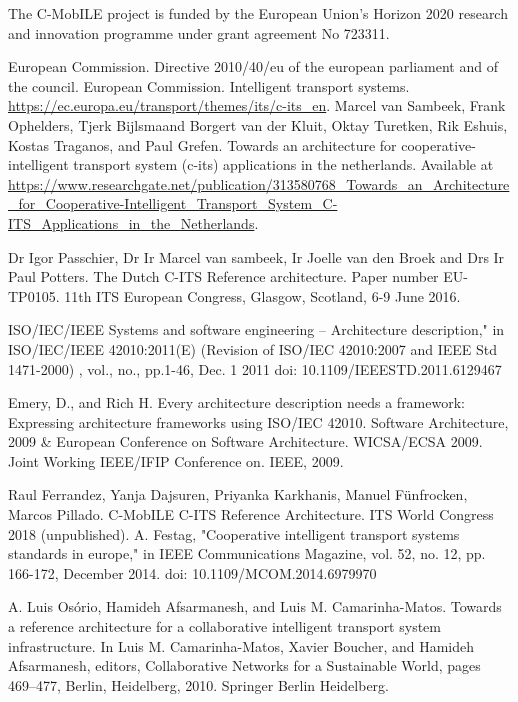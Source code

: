\documentclass[conference]{IEEEtran}
\begin{document}
The C-MobILE project is funded by the European Union's Horizon 2020 research and innovation programme under grant agreement No 723311.


\begin{thebibliography}{00}

     European Commission. Directive 2010/40/eu of the european parliament and of the council.
     European Commission. Intelligent transport systems. \url{https://ec.europa.eu/transport/themes/its/c-its_en}.
     Marcel van Sambeek, Frank Ophelders, Tjerk Bijlsmaand Borgert van der Kluit, Oktay Turetken, Rik Eshuis, Kostas Traganos, and Paul Grefen. Towards an architecture for cooperative-intelligent transport system (c-its) applications in the netherlands. Available at \url{ https://www.researchgate.net/publication/313580768_Towards_an_Architecture_for_Cooperative-Intelligent_Transport_System_C-ITS_Applications_in_the_Netherlands}.

	 Dr Igor Passchier, Dr Ir Marcel van sambeek, Ir Joelle van den Broek and Drs Ir Paul Potters. The Dutch C-ITS Reference architecture. Paper number EU-TP0105. 11th ITS European Congress, Glasgow, Scotland, 6-9 June 2016.

     ISO/IEC/IEEE Systems and software engineering -- Architecture description," in ISO/IEC/IEEE 42010:2011(E) (Revision of ISO/IEC 42010:2007 and IEEE Std 1471-2000) , vol., no., pp.1-46, Dec. 1 2011 doi: 10.1109/IEEESTD.2011.6129467
    
    Emery, D., and Rich H. Every architecture description needs a framework: Expressing architecture frameworks using ISO/IEC 42010. Software Architecture, 2009 \& European Conference on Software Architecture. WICSA/ECSA 2009. Joint Working IEEE/IFIP Conference on. IEEE, 2009.
    
    Raul Ferrandez, Yanja Dajsuren, Priyanka Karkhanis, Manuel Fünfrocken, Marcos Pillado. C-MobILE C-ITS Reference Architecture. ITS World Congress 2018 (unpublished).
    A. Festag, "Cooperative intelligent transport systems standards in europe," in IEEE Communications Magazine, vol. 52, no. 12, pp. 166-172, December 2014.  doi: 10.1109/MCOM.2014.6979970
    
     A. Luis Osório, Hamideh Afsarmanesh, and Luis M. Camarinha-Matos. Towards a reference architecture
    for a collaborative intelligent transport system infrastructure. In Luis M. Camarinha-Matos, Xavier Boucher, and Hamideh Afsarmanesh, editors, Collaborative Networks for a Sustainable
    World, pages 469–477, Berlin, Heidelberg, 2010. Springer Berlin Heidelberg.
    

\end{thebibliography}
\end{document}
